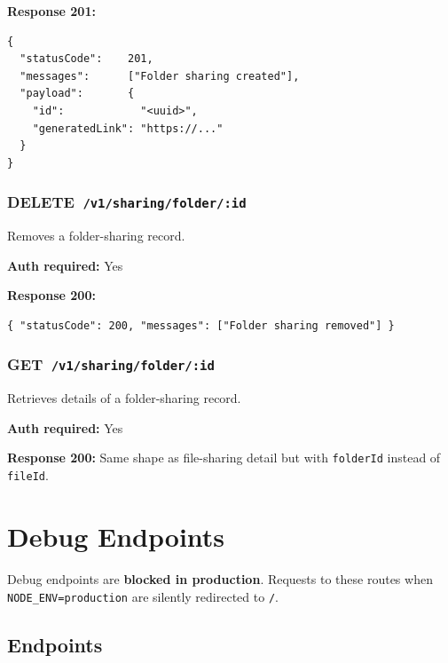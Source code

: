 \documentclass[12pt,a4paper]{article}
\newcommand{\httpget}[1]{%
  \colorbox{getcolor!20}{\textcolor{getcolor}{\textbf{\small GET}}}~\texttt{#1}%
}
\newcommand{\httpdelete}[1]{%
  \colorbox{deletecolor!20}{\textcolor{deletecolor}{\textbf{\small DELETE}}}~\texttt{#1}%
}
\begin{document}
\textbf{Response 201:}
\begin{lstlisting}
{
  "statusCode":    201,
  "messages":      ["Folder sharing created"],
  "payload":       {
    "id":            "<uuid>",
    "generatedLink": "https://..."
  }
}
\end{lstlisting}

\vspace{0.5em}
\subsubsection{\httpdelete{/v1/sharing/folder/:id}}

Removes a folder-sharing record.

\textbf{Auth required:} Yes

\textbf{Response 200:}
\begin{lstlisting}
{ "statusCode": 200, "messages": ["Folder sharing removed"] }
\end{lstlisting}

\vspace{0.5em}
\subsubsection{\httpget{/v1/sharing/folder/:id}}

Retrieves details of a folder-sharing record.

\textbf{Auth required:} Yes

\textbf{Response 200:} Same shape as file-sharing detail but with \texttt{folderId} instead of \texttt{fileId}.

\newpage

\section{Debug Endpoints}

\begin{warningbox}
  Debug endpoints are \textbf{blocked in production}. Requests to these routes when \texttt{NODE\_ENV=production} are silently redirected to \texttt{/}.
\end{warningbox}

\subsection{Endpoints}
\end{document}

